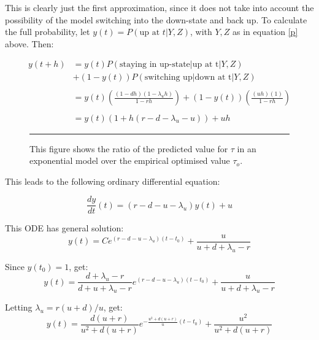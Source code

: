 This is clearly just the first approximation, since it does not take into account the possibility of the model switching into the down-state and back up.  To calculate the full probability, let $y(t) = P(\mbox{up at } t | Y , Z)$, with $Y,Z$ as in equation \ref{p} above.  Then:

\begin{equation}
\begin{split}
y(t+h) &=  y(t)P(\mbox{staying in up-state} | \mbox{up at t}|Y,Z)  \\
& + (1-y(t))P(\mbox{switching up} | \mbox{down at t}|Y,Z)\\
&\\
&= y(t)\left( \frac{(1-dh)(1-\lambda_uh)}{1-rh} \right) + (1-y(t)) \left(\frac{(uh)(1)}{1-rh}  \right)\\
&\\
& = y(t)\left( 1 + h(r-d-\lambda_u-u ) \right) + uh
\end{split}
\end{equation}

\begin{figure}[b!]
\begin{center}
\resizebox{0.75\textwidth}{!}{}
\bigskip
\rule{33em}{0.5pt}
\caption{\label{predovertauopt} This figure shows the ratio of the predicted value for $\tau$ in an exponential model over the empirical optimised value $\tau_o$.}
\end{center}
\end{figure}

This leads to the following ordinary differential equation:

\begin{equation}
\frac{dy}{dt}(t) = \left( r - d - u - \lambda_u \right)y(t) + u
\end{equation}

This ODE has general solution:
\begin{equation}
y(t) = Ce^{(r-d-u-\lambda_u)(t-t_0)} + \frac{u}{u+d+\lambda_u - r}
\end{equation}

Since $y(t_0) = 1$, get:
\begin{equation}
y(t) = \frac{d+\lambda_u - r}{d+u+\lambda_u -r} e^{(r-d-u-\lambda_u)(t-t_0)} + \frac{u}{u+d+\lambda_u-r}
\end{equation}

Letting $\lambda_u = r(u+d)/u$, get:
\begin{equation}
y(t) = \frac{d(u+r)}{u^2 + d(u+r)} e^{-\frac{u^2+d(u+r)}{u}(t-t_0)} + \frac{u^2}{u^2+ d(u+r)}
\end{equation}

